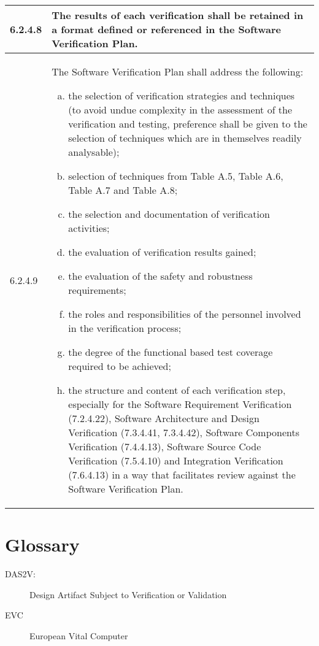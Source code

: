 \documentclass{template/openetcs_report}
\begin{document}
{\begin{longtable}{||p{}|p{}||}
    \\
    \hline 6.2.4.8 & The results of each verification shall be
    retained in a format defined or referenced in the Software
    Verification Plan.
    \\
    \hline 6.2.4.9 & The Software Verification Plan shall address the
    following:
    \begin{enumerate}[a)]
    \item the selection of verification strategies and techniques (to
      avoid undue complexity in the assessment of the verification and
      testing, preference shall be given to the selection of
      techniques which are in themselves readily analysable);
    \item selection of techniques from Table A.5, Table A.6, Table A.7
      and Table A.8;
    \item  the selection and documentation of verification activities;  
    \item  the evaluation of verification results gained;   
    \item  the evaluation of the safety and robustness requirements;  
    \item the roles and responsibilities of the personnel involved in
      the verification process;
    \item the degree of the functional based test coverage required to
      be achieved;
    \item the structure and content of each verification step,
      especially for the Software Requirement Verification (7.2.4.22),
      Software Architecture and Design Verification (7.3.4.41,
      7.3.4.42), Software Components Verification (7.4.4.13), Software
      Source Code Verification (7.5.4.10) and Integration Verification
      (7.6.4.13) in a way that facilitates review against the Software
      Verification Plan.
    \end{enumerate}
    \\
    \hline
\end{longtable}}


\section{Glossary}
\label{sec:glossary}

\begin{description}
\item [DAS2V:] Design Artifact Subject to Verification or Validation
\item[EVC] European Vital Computer
\end{description}






\nocite{*}
\end{document}
